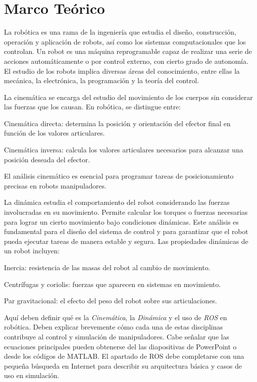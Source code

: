 \chapter{Marco Teórico} 
\label{chap:marco_teorico}

La robótica es una rama de la ingeniería que estudia el diseño, construcción, operación y aplicación de robots, así como los sistemas computacionales que los controlan. Un robot es una máquina reprogramable capaz de realizar una serie de acciones automáticamente o por control externo, con cierto grado de autonomía. El estudio de los robots implica diversas áreas del conocimiento, entre ellas la mecánica, la electrónica, la programación y la teoría del control.

La cinemática se encarga del estudio del movimiento de los cuerpos sin considerar las fuerzas que los causan. En robótica, se distingue entre:


Cinemática directa: determina la posición y orientación del efector final en función de los valores articulares.


Cinemática inversa: calcula los valores articulares necesarios para alcanzar una posición deseada del efector.


El análisis cinemático es esencial para programar tareas de posicionamiento precisas en robots manipuladores.

La dinámica estudia el comportamiento del robot considerando las fuerzas involucradas en su movimiento. Permite calcular los torques o fuerzas necesarias para lograr un cierto movimiento bajo condiciones dinámicas. Este análisis es fundamental para el diseño del sistema de control y para garantizar que el robot pueda ejecutar tareas de manera estable y segura.
Las propiedades dinámicas de un robot incluyen:


Inercia: resistencia de las masas del robot al cambio de movimiento.


Centrífugas y coriolis: fuerzas que aparecen en sistemas en movimiento.


Par gravitacional: el efecto del peso del robot sobre sus articulaciones.



Aquí deben definir qué es la \textit{Cinemática}, la \textit{Dinámica} y el uso de \textit{ROS} en robótica. Deben explicar brevemente cómo cada una de estas disciplinas contribuye al control y simulación de manipuladores. Cabe señalar que las ecuaciones principales pueden obtenerse del las diapositivas de PowerPoint o desde los códigos de MATLAB. El apartado de ROS debe completarse con una pequeña búsqueda en Internet para describir su arquitectura básica y casos de uso en simulación.
